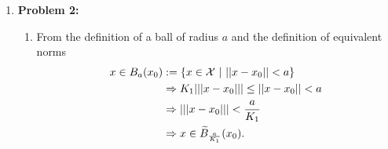 \documentclass[letterpaper]{article}
\begin{document}
\begin{enumerate}
\underline{Alternative way of showing that $\forall x\in \real^{n}, \left\Vert x\right\Vert_{1} \le \sqrt{n} \left\Vert x\right\Vert _{2}$}\\

Suppose that $\forall x\in \real^{n},~\left\Vert x\right\Vert_{1} \le K\left\Vert x\right\Vert_{2}$. We seek to find the smallest $K$.
$$\forall x \in \real^{n},~x\not=0,~K\ge \frac{\left\Vert x\right\Vert_{1}}{\left\Vert x\right\Vert_{2}}$$
$$\therefore K \ge \max\limits_{\substack{x\in \real^{n} \\ x\not=0}}\frac{\left\Vert x\right\Vert_{1}}{\left\Vert x\right\Vert_{2}}=\max\limits_{\left\Vert x\right\Vert_{2}=1} \sum_{i=1}^{n}|x_{i}|$$
Since for $x=(x_1 , \cdots , x_n ) \in \real^n ,~\left\Vert (|x_1| , \cdots , |x_n| )\right\Vert_{\alpha} = \left\Vert (x_1 , \cdots , x_n )\right\Vert_{\alpha},~\alpha \ge 1$, the above maximization problem is equivalent to
$$K \ge \max\limits_{\substack{\left\Vert x\right\Vert_{2}=1 \\ x_{i} \ge 0}} \sum_{i=1}^{n}x_{i} = \max\limits_{\substack{x_{i} \ge 0 \\ \lambda \not= 0}} \sum_{i=1}^{n}x_{i} + \lambda \left(1-\sum_{i=1}^{n}(x_{i})^2\right)$$
Using Lagrange multipliers.
\begin{align*}
&\therefore 0=\frac{\partial}{\partial x_{i}} \Rightarrow 1-2\lambda x_{i} =0,~i=1,2,\cdots n \\
&\therefore 0=\frac{\partial}{\partial \lambda} \Rightarrow 1-\sum_{i=1}^{n} (x_{i})^2 =0 \\
&\Rightarrow x_{i} = \frac{1}{2\lambda},i = 1,2,\cdots,n
\end{align*}
and thus, $\lambda=\dfrac{\sqrt{n}}{2}$ and $x_{i}= \dfrac{1}{\sqrt{n}}$
$$\therefore \max\limits_{\substack{\left\Vert x\right\Vert_{2}=1 \\ x_{i} \ge 0}} \sum_{i=1}^{n}x_{i} = \frac{n}{\sqrt{n}} = \sqrt{n}$$
$\therefore$ We can take $\boxed{K=\sqrt{n}}$. Moreover, we now know that this is the smallest possible value for $K$. \hfill$\square$


\item \noindent \textbf{Problem 2:}

\begin{enumerate}
\setlength{\itemsep}{.1in}
\renewcommand{\labelenumi}{(\alph{enumi})}
\item  From the definition of a ball of radius $a$ and the definition of equivalent norms
\begin{align*}
 x\in B_a(x_0) &:=\{x\in {\cal X}~|~||x-x_0|| < a \}  \\
 & \Rightarrow K_1 |||x-x_0||| \le ||x-x_0|| < a  \medskip \\
 & \Rightarrow |||x-x_0||| < \frac{a}{K_1 } \\
 &  \Rightarrow x \in \widetilde{B}_{\frac{a}{K_1}}(x_0).
 \end{align*}


\end{enumerate}
\end{enumerate}
\end{document}
